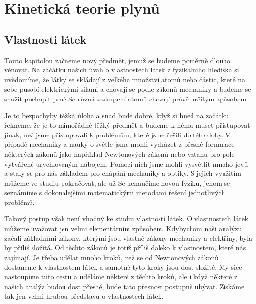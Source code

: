 \setchaptertoc
\chapter{Kinetická teorie plynů}\label{fyz:IchapIXL}  
  \section{Vlastnosti látek}\label{fyz:IchapIXLsecI}
    Touto kapitolou začneme nový předmět, jemuž se budeme poměrně dlouho věnovat. Na začátku našich
    úvah o vlastnostech látek z fyzikálního hlediska si uvědomíme, že látky se skládají z velkého
    množství atomů nebo částic, které na sebe působí elektrickými silami a chovají se podle zákonů
    mechaniky a budeme se snažit pochopit proč Se různá seskupení atomů chovají právě určitým
    způsobem.
    
    Je to bezpochyby těžká úloha a snad bude dobré, když si hned na začátku řekneme, že je to
    mimořádně těžký předmět a budeme k němu muset přistupovat jinak, než jsme přistupovali k
    problémům, které jsme řešili do této doby. V případě mechaniky a nauky o světle jsme mohli
    vycházet z přesné formulace některých zákonů jako například Newtonových zákonů nebo vztahu pro
    pole vytvářené urychlovaným nábojem. Pomocí nich jsme mohli vysvětlit mnoho jevů a staly se pro
    nás základem pro chápání mechaniky a optiky. S jejich využitím můžeme ve studiu pokračovat, ale
    už Se nenaučíme novou fyziku, jenom se seznámíme s dokonalejšími matematickými metodami řešení
    jednotlivých problémů.
    
    Takový postup však není vhodný ke studiu vlastností látek. O vlastnostech látek můžeme uvažovat
    jen velmi elementárním způsobem. Kdybychom naši analýzu začali základními zákony, kterými jsou
    vlastně zákony mechaniky a elektřiny, byla by příliš složitá. Od těchto zákonů je totiž příliš
    daleko k vlastnostem, které nás zajímají. Je třeba udělat mnoho kroků, než se od Newtonových
    zákonů dostaneme k vlastnostem látek a samotné tyto kroky jsou dost složité. My sice nastoupíme
    tuto cestu a uděláme některé z těchto kroků, ale i když některé z našich analýz budou dost
    přesné, bude tato přesnost postupně ubývat. Získáme tak jen velmi hrubou představu o
    vlastnostech látek.
    
